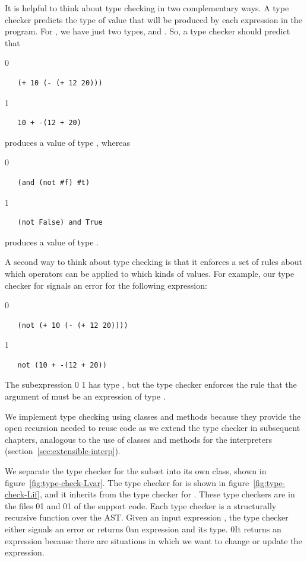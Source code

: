 \documentclass[7x10]{TimesAPriori_MIT}%
\def\racketEd{0}
\def\pythonEd{1}
\def\edition{1}
\newcommand{\racket}[1]{{\if\edition\racketEd{#1}\fi}}
\newcommand{\pythonColor}[0]{}
\newcommand{\python}[1]{{\if\edition\pythonEd\pythonColor #1\fi}}
\numberwithin{theorem}{chapter}
\numberwithin{definition}{chapter}
\numberwithin{equation}{chapter}
\begin{document}
It is helpful to think about type checking in two complementary ways. A type checker predicts the
type of value that will be produced by each expression in the program.
For \LangIf{}, we have just two types, \INTTY{} and \BOOLTY{}. So, a
type checker should predict that {\if\edition\racketEd
\begin{lstlisting}
   (+ 10 (- (+ 12 20)))
\end{lstlisting}
\fi}
{\if\edition\pythonEd\pythonColor
\begin{lstlisting}
   10 + -(12 + 20)
\end{lstlisting}
\fi}
\noindent produces a value of type \INTTY{}, whereas
{\if\edition\racketEd
\begin{lstlisting}
   (and (not #f) #t)
\end{lstlisting}
\fi}
{\if\edition\pythonEd\pythonColor
\begin{lstlisting}
   (not False) and True
\end{lstlisting}
\fi}
\noindent produces a value of type \BOOLTY{}.

A second way to think about type checking is that it enforces a set of
rules about which operators can be applied to which kinds of
values. For example, our type checker for \LangIf{} signals an error
for the following expression:
%
{\if\edition\racketEd
\begin{lstlisting}
   (not (+ 10 (- (+ 12 20))))
\end{lstlisting}
\fi}
{\if\edition\pythonEd\pythonColor
\begin{lstlisting}
   not (10 + -(12 + 20))
\end{lstlisting}
\fi}
\noindent The subexpression
\racket{}
\python{}
has type \INTTY{}, but the type checker enforces the rule that the
argument of  must be an expression of type \BOOLTY{}.

We implement type checking using classes and methods because they
provide the open recursion needed to reuse code as we extend the type
checker in subsequent chapters, analogous to the use of classes and methods
for the interpreters (section~\ref{sec:extensible-interp}).

We separate the type checker for the \LangVar{} subset into its own
class, shown in figure~\ref{fig:type-check-Lvar}. The type checker for
\LangIf{} is shown in figure~\ref{fig:type-check-Lif}, and it inherits
from the type checker for \LangVar{}. These type checkers are in the
files
\racket{}\python{}
and
\racket{}\python{}
of the support code.
%
Each type checker is a structurally recursive function over the AST.
Given an input expression , the type checker either signals an
error or returns \racket{an expression and} its type.
%
\racket{It returns an expression because there are situations in which
  we want to change or update the expression.}
\end{document}
